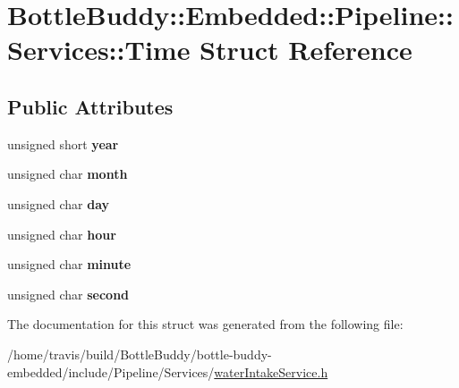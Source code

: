 \hypertarget{struct_bottle_buddy_1_1_embedded_1_1_pipeline_1_1_services_1_1_time}{}\section{Bottle\+Buddy\+:\+:Embedded\+:\+:Pipeline\+:\+:Services\+:\+:Time Struct Reference}
\label{struct_bottle_buddy_1_1_embedded_1_1_pipeline_1_1_services_1_1_time}
\subsection*{Public Attributes}
\begin{DoxyCompactItemize}
\item 
unsigned short {\bfseries year}\hypertarget{struct_bottle_buddy_1_1_embedded_1_1_pipeline_1_1_services_1_1_time_ae5a5c4a1b170dde41d4c915f8635d9ee}{}\label{struct_bottle_buddy_1_1_embedded_1_1_pipeline_1_1_services_1_1_time_ae5a5c4a1b170dde41d4c915f8635d9ee}

\item 
unsigned char {\bfseries month}\hypertarget{struct_bottle_buddy_1_1_embedded_1_1_pipeline_1_1_services_1_1_time_afdd86700e0cf4de862c0ecc4b9f5b3f9}{}\label{struct_bottle_buddy_1_1_embedded_1_1_pipeline_1_1_services_1_1_time_afdd86700e0cf4de862c0ecc4b9f5b3f9}

\item 
unsigned char {\bfseries day}\hypertarget{struct_bottle_buddy_1_1_embedded_1_1_pipeline_1_1_services_1_1_time_a26b3b9a68986fe981c36890b21b95fed}{}\label{struct_bottle_buddy_1_1_embedded_1_1_pipeline_1_1_services_1_1_time_a26b3b9a68986fe981c36890b21b95fed}

\item 
unsigned char {\bfseries hour}\hypertarget{struct_bottle_buddy_1_1_embedded_1_1_pipeline_1_1_services_1_1_time_a3e81856550f8a06187aa6afc5852fb07}{}\label{struct_bottle_buddy_1_1_embedded_1_1_pipeline_1_1_services_1_1_time_a3e81856550f8a06187aa6afc5852fb07}

\item 
unsigned char {\bfseries minute}\hypertarget{struct_bottle_buddy_1_1_embedded_1_1_pipeline_1_1_services_1_1_time_a4d9063ff89b95792914495330f3e1d84}{}\label{struct_bottle_buddy_1_1_embedded_1_1_pipeline_1_1_services_1_1_time_a4d9063ff89b95792914495330f3e1d84}

\item 
unsigned char {\bfseries second}\hypertarget{struct_bottle_buddy_1_1_embedded_1_1_pipeline_1_1_services_1_1_time_acf86509e5bba44ef34e5b218614d0af3}{}\label{struct_bottle_buddy_1_1_embedded_1_1_pipeline_1_1_services_1_1_time_acf86509e5bba44ef34e5b218614d0af3}

\end{DoxyCompactItemize}


The documentation for this struct was generated from the following file\+:\begin{DoxyCompactItemize}
\item 
/home/travis/build/\+Bottle\+Buddy/bottle-\/buddy-\/embedded/include/\+Pipeline/\+Services/\hyperlink{water_intake_service_8h}{water\+Intake\+Service.\+h}\end{DoxyCompactItemize}
